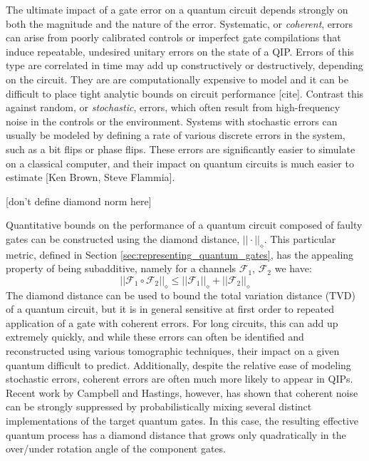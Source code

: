 \documentclass[aps,nofootinbib,pra,notitlepage,twocolumn]{revtex4-1}
\newcommand{\note}[1]{{\color{red}[#1]}}
\begin{document}
The ultimate impact of a gate error on a quantum circuit depends strongly on both the magnitude and the nature of the error. Systematic, or \emph{coherent}, errors can arise from poorly calibrated controls or imperfect gate compilations that induce repeatable, undesired unitary errors on the state of a QIP. Errors of this type are correlated in time may add up constructively or destructively, depending on the circuit. They are are  computationally expensive to model and it can be difficult to place tight analytic bounds on circuit performance [cite]. Contrast this against random, or \emph{stochastic}, errors, which often result from high-frequency noise in the controls or the environment. Systems with stochastic errors can usually be modeled by defining a rate of various discrete errors in the system, such as a bit flips or phase flips. These errors are significantly easier to simulate on a classical computer, and their impact on quantum circuits is much easier to estimate [Ken Brown, Steve Flammia].



\note{don't define diamond norm here}

Quantitative bounds on the performance of a quantum circuit composed of faulty gates can be constructed using the diamond distance, $||\cdot||_\diamond$. This particular metric, defined in Section \ref{sec:representing_quantum_gates}, has the appealing property of being subadditive, namely for a channels $\mathcal{F}_1$, $\mathcal{F}_2$ we have:
\begin{equation}
||\mathcal{F}_1\circ\mathcal{F}_2||_\diamond \leq ||\mathcal{F}_1||_\diamond + ||\mathcal{F}_2||_\diamond
\end{equation}
The diamond distance can be used to bound the total variation distance (TVD) of a quantum circuit, but it is in general sensitive at first order to repeated application of a gate with coherent errors. For long circuits, this can add up extremely quickly, and while these errors can often be identified and reconstructed using various tomographic techniques, their impact on a given quantum  difficult to predict. Additionally, despite the relative ease of modeling stochastic errors, coherent errors are often much more likely to appear in QIPs. Recent work by Campbell and Hastings\cite{Campbell2017, 1612.01011, 1811.08017}, however, has shown that coherent noise can be strongly suppressed by probabilistically mixing several distinct implementations of the target quantum gates. In this case, the resulting effective quantum process has a diamond distance that grows only quadratically in the over/under rotation angle of the component gates. 
\end{document}
